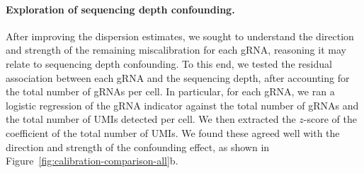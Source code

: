 \documentclass{nature}
\begin{document}
%
%
%

\paragraph{Exploration of sequencing depth confounding.}

After improving the dispersion estimates, we sought to understand the direction and strength of the remaining miscalibration for each gRNA, reasoning it may relate to sequencing depth confounding. To this end, we tested the residual association between each gRNA and the sequencing depth, after accounting for the total number of gRNAs per cell. In particular, for each gRNA, we ran a logistic regression of the gRNA indicator against the total number of gRNAs and the total number of UMIs detected per cell. We then extracted the $z$-score of the coefficient of the total number of UMIs. We found these agreed well with the direction and strength of the confounding effect, as shown in Figure~\ref{fig:calibration-comparison-all}b.
\end{document}
